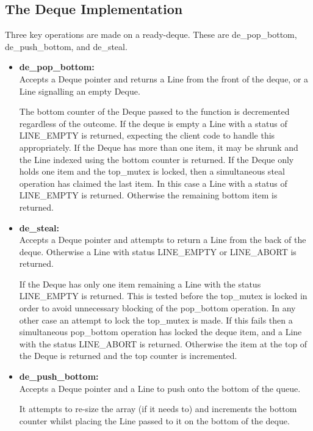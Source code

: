 \subsection{The Deque Implementation}
\label{sec:dequeimp}

Three key operations are made on a \gls{ready-deque}. These are de\_pop\_bottom, de\_push\_bottom, and de\_steal.

\begin{itemize}
\item \textbf{de\_pop\_bottom: } \\
                         Accepts a Deque pointer and returns a Line from the front of the deque, or a Line signalling an empty Deque.
                         
                         The bottom counter of the Deque passed to the function is decremented regardless of the outcome.
                         If the deque is empty a Line with a status of LINE\_EMPTY is returned, 
                         expecting the client code to handle this appropriately. 
                         If the Deque has more than one item, it may be shrunk and the Line indexed using the bottom counter is returned.
                         If the Deque only holds one item and the top\_mutex is locked, then a simultaneous steal operation has claimed
                         the last item. In this case a Line with a status of LINE\_EMPTY is returned. 
                         Otherwise the remaining bottom item is returned.

\item \textbf{de\_steal: } \\
                         Accepts a Deque pointer and attempts to return a Line from the back of the deque. Otherwise a Line with 
                         status LINE\_EMPTY or LINE\_ABORT is returned. 
                         
                         If the Deque has only one item remaining a Line with the status LINE\_EMPTY is returned. 
                         This is tested before the top\_mutex is locked in order to avoid unnecessary blocking of the pop\_bottom operation.
                         In any other case an attempt to lock the top\_mutex is made. If this fails then a simultaneous pop\_bottom operation
                         has locked the deque item, and a Line with the status LINE\_ABORT is returned. 
                         Otherwise the item at the top of the Deque is returned and the top counter is incremented.

\item \textbf{de\_push\_bottom: } \\
                         Accepts a Deque pointer and a Line to push onto the bottom of the queue. 
                         
                         It attempts to re-size the array (if it needs to) and increments the bottom counter whilst placing the 
                         Line passed to it on the bottom of the deque.
\end{itemize}

